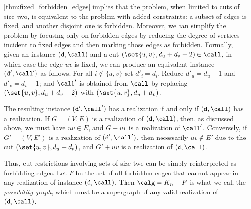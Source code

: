 \cref{thm:fixed_forbidden_edges} implies that the \GRC{} problem, when limited to cuts of size two, is equivalent to the \GR{} problem with added constraints: a subset of edges is fixed, and another disjoint one is forbidden. Moreover, we can simplify the problem by focusing only on forbidden edges by reducing the degree of vertices incident to fixed edges and then marking those edges as forbidden.
%
Formally, given an instance $(\texttt{d}, \call)$ and a cut $(\set{u, v}, d_u + d_v - 2) \in \call$, in which case the edge $uv$ is fixed, we can produce an equivalent instance $(\texttt{d}', \call')$ as follows.  For all $i \notin \{u, v\}$  set $d'_i = d_i$. Reduce $d'_u = d_u - 1$ and   $d'_v = d_v - 1$;  
and $\call'$ is obtained from $\call$ by replacing $(\set{u, v}, d_u + d_v - 2)$ with $(\set{u, v}, d_u + d_v)$.


The resulting instance $(\texttt{d}', \call')$ has a realization if and only if $(\texttt{d}, \call)$ has a realization. If $G = (V, E)$ is a realization of $(\texttt{d}, \call)$, then, as discussed above, we must have $uv \in E$, and $G - uv$ is a realization of $\call'$. Conversely, if $G' = (V, E')$ is a realization of $(\texttt{d}', \call')$, then necessarily $uv \notin E'$ due to the cut $(\set{u, v}, d_u + d_v)$, and $G' + uv$ is a realization of $(\texttt{d}, \call)$.

Thus, cut restrictions involving sets of size two can be simply reinterpreted as forbidding edges.
%
Let $F$ be the set of all forbidden edges that cannot appear in any realization of instance $(\texttt{d}, \call)$. Then $\calg = K_n - F$ is what we call the \emph{possibility graph}, which must be a supergraph of any valid realization of~$(\texttt{d}, \call)$.
